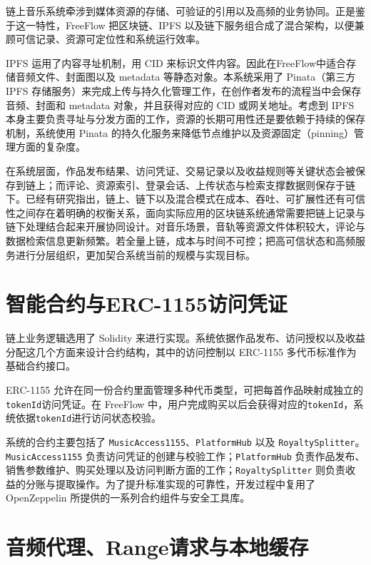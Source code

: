 链上音乐系统牵涉到媒体资源的存储、可验证的引用以及高频的业务协同。正是鉴于这一特性，FreeFlow 把区块链、IPFS 以及链下服务组合成了混合架构，以便兼顾可信记录、资源可定位性和系统运行效率。

IPFS 运用了内容寻址机制，用 CID 来标识文件内容。因此在FreeFlow中适合存储音频文件、封面图以及 metadata 等静态对象\cite{ipfsDocs}。本系统采用了 Pinata（第三方 IPFS 存储服务）来完成上传与持久化管理工作，在创作者发布的流程当中会保存音频、封面和 metadata 对象，并且获得对应的 CID 或网关地址\cite{pinataDocs}。考虑到 IPFS 本身主要负责寻址与分发方面的工作，资源的长期可用性还是要依赖于持续的保存机制，系统使用 Pinata 的持久化服务来降低节点维护以及资源固定（pinning）管理方面的复杂度\cite{ipfsPinning}。

在系统层面，作品发布结果、访问凭证、交易记录以及收益规则等关键状态会被保存到链上；而评论、资源索引、登录会话、上传状态与检索支撑数据则保存于链下。已经有研究指出，链上、链下以及混合模式在成本、吞吐、可扩展性还有可信性之间存在着明确的权衡关系，面向实际应用的区块链系统通常需要把链上记录与链下处理结合起来开展协同设计\cite{Wei2022BDMSSurvey,Six2022DAppPatterns,Liu2020GasExceptions}。对音乐场景，音轨等资源文件体积较大，评论与数据检索信息更新频繁。若全量上链，成本与时间不可控；把高可信状态和高频服务进行分层组织，更加契合系统当前的规模与实现目标。

\section{智能合约与ERC-1155访问凭证}

链上业务逻辑选用了 Solidity 来进行实现\cite{solidityDocs}。系统依据作品发布、访问授权以及收益分配这几个方面来设计合约结构，其中的访问控制以 ERC-1155 多代币标准作为基础\cite{eip1155}合约接口。

ERC-1155 允许在同一份合约里面管理多种代币类型，可把每首作品映射成独立的\texttt{tokenId}访问凭证。在 FreeFlow 中，用户完成购买以后会获得对应的\texttt{tokenId}，系统依据\texttt{tokenId}进行访问状态校验。

系统的合约主要包括了 \texttt{MusicAccess1155}、\texttt{PlatformHub} 以及 \texttt{RoyaltySplitter}。\texttt{MusicAccess1155} 负责访问凭证的创建与校验工作；\texttt{PlatformHub} 负责作品发布、销售参数维护、购买处理以及访问判断方面的工作；\texttt{RoyaltySplitter} 则负责收益的分账与提取操作。为了提升标准实现的可靠性，开发过程中复用了 OpenZeppelin 所提供的一系列合约组件与安全工具库\cite{openzeppelinContracts}。

\section{音频代理、Range请求与本地缓存}

